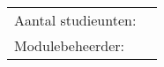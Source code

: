 \ 
\vspace{5cm}

\begin{center}

	
	\Large \textbf \organisatie
	
	\vspace{1.5cm}
	
	\HRule \\[0.4cm]
	
	\Huge \textbf \modulenaam
	
	\vspace{1.7cm}
	
	\Large \textbf  \modulecode
	
	\vspace{0.4cm}
	
	\HRule \\[1.5cm]
\end{center}
\vfill

\begin{tabular}{l l}
	Aantal studieunten:  & \stdPunten\\
	Modulebeheerder: & \author\\
\end{tabular}
